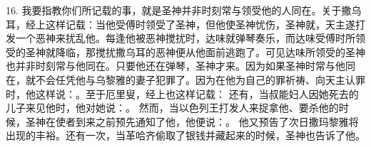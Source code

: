 16. 我要指教你们所记载的事，就是圣神并非时刻常与领受他的人同在。关于撒乌耳，经上这样记载：当他受傅时领受了圣神，但他使圣神忧伤，圣神就，天主遂打发一个恶神来扰乱他。每逢他被恶神搅扰时，达味就弹琴奏乐，而达味受傅时所领受的圣神就降临，那搅扰撒乌耳的恶神便从他面前逃跑了。可见达味所领受的圣神也并非时刻常与他同在。只要他还在弹琴，圣神才来。因为如果圣神时常与他同在，就不会任凭他与乌黎雅的妻子犯罪了。因为在他为自己的罪祈祷、向天主认罪时，他这样说：。至于厄里叟，经上也这样记载： 还有，当叔能妇人因她死去的儿子来见他时，他对她说：。 然而，当以色列王打发人来捉拿他、要杀他的时候，圣神在使者到来之前预先通知了他，他便说：。 他又预告了次日撒玛黎雅将出现的丰裕。还有一次，当革哈齐偷取了银钱并藏起来的时候，圣神也告诉了他。\par

